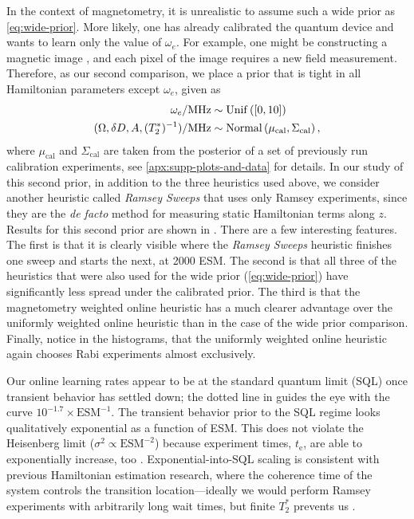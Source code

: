 \documentclass[aps,nofootinbib,twocolumn,superscriptaddress]{revtex4}
\newcommand{\calib}{{\text{cal}}}
\newcommand{\te}{t_\text{e}}
\begin{document}
In the context of magnetometry, it is unrealistic to assume such a
wide prior as \autoref{eq:wide-prior}.
More likely, one has already calibrated the quantum device and wants to
learn only the value of $\omega_e$.
For example, one might be constructing a magnetic image
\cite{
    maletinsky_robust_2012,
    grinolds_nanoscale_2013,
    rondin_stray-field_2013}, 
and each
pixel of the image requires a new field measurement.
Therefore, as our second comparison, we place a prior that is tight in all
Hamiltonian parameters except $\omega_e$, given as
\begin{subequations}
\begin{align}
    \omega_e/\si{MHz} 
        &\sim \uniformdist\left( [0, 10] \right) \\
    (\Omega,\delta D,A,(T_2^*)^{-1})/\si{MHz}
        &\sim \normaldist\left(
            \mu_\calib,
            \Sigma_\calib
        \right),
\end{align}
\label{eq:calibrated-prior}
\end{subequations}
where $\mu_\calib$ and $\Sigma_\calib$ are taken
from the posterior of a set of previously run calibration
experiments, see \autoref{apx:supp-plots-and-data} for
details.
In our study of this second prior, in addition to 
the three heuristics used above,
we consider another heuristic called \textit{Ramsey Sweeps} that uses only
Ramsey experiments, since they are the \textit{de facto} method for 
measuring static Hamiltonian terms along $z$.
Results for this second prior 
are shown in .
There are a few interesting features.
The first is that it is clearly visible where the \textit{Ramsey Sweeps}
heuristic finishes one sweep and starts the next, at 2000 ESM.
The second is that all three of the heuristics that were also used 
for the wide prior (\autoref{eq:wide-prior}) have significantly
less spread under the calibrated prior.
The third is that the magnetometry weighted online heuristic has a much
clearer advantage over the uniformly weighted online heuristic than in
the case of the wide prior comparison.
Finally, notice in the histograms, that the uniformly weighted 
online heuristic again chooses Rabi experiments almost 
exclusively.

Our online
learning rates appear to be at the standard quantum limit (SQL) 
once transient
behavior has settled down; the dotted line in  guides the eye with the 
curve $10^{-1.7}\times\text{ESM}^{-1}$.
The transient behavior prior to the SQL regime 
looks qualitatively exponential as a function of ESM.
This does not violate the Heisenberg limit 
($\sigma^2\propto \text{ESM}^{-2}$) because experiment times,
$\te$, are able to exponentially increase, too
 \cite{sergeevich_characterization_2011}.
Exponential-into-SQL scaling is consistent with previous
Hamiltonian estimation research, where the coherence time of the system 
controls the transition location---ideally we would 
perform Ramsey experiments with arbitrarily long wait times, but 
finite $T_2^*$ prevents us \cite{ferrie_how_2013}.
\end{document}
